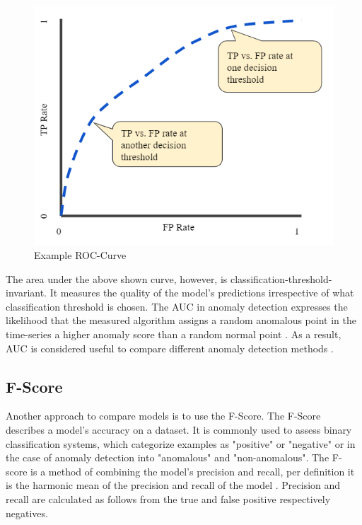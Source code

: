 \begin{figure}[h]
	\centering
	\includegraphics[scale=00.4]{Figures/ROC}
	\decoRule
	\caption[Example ROC-Curve]{Example ROC-Curve \parencite{Google2021}}
	\label{fig:ROC}
\end{figure}

The area under the above shown curve, however, is classification-threshold-invariant. It measures the quality of the model's predictions irrespective of what classification threshold is chosen. The AUC in anomaly detection expresses the likelihood that the measured algorithm assigns a random anomalous point in the time-series a higher anomaly score than a random normal point \parencite{Google2021}. As a result, AUC is considered useful to compare different anomaly detection methods \parencite{Braei2020} .

\subsection{F-Score} \label{FScore}
Another approach to compare models is to use the F-Score. The F-Score describes a model's accuracy on a dataset. It is commonly used to assess binary classification systems, which categorize examples as "positive" or "negative" or in the case of anomaly detection into "anomalous" and "non-anomalous". The F-score is a method of combining the model's precision and recall, per definition it is the harmonic mean of the precision and recall of the model \parencite{Shung2018}. Precision and recall are calculated as follows from the true and false positive respectively negatives.

